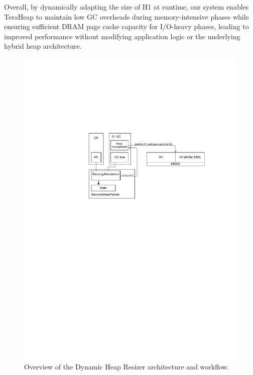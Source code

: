 Overall, by dynamically adapting the size of H1 at runtime, our system enables TeraHeap to maintain low GC overheads during memory-intensive phases while ensuring sufficient DRAM page cache capacity for I/O-heavy phases, leading to improved performance without modifying application logic or the underlying hybrid heap architecture.

\begin{figure}[htbp]
  \centering
\includegraphics[width=1.1\columnwidth]{fig/HeapResizer.pdf}
  \caption{Overview of the Dynamic Heap Resizer architecture and workflow.}
  \label{fig:dynamic_heap_resizer}
\end{figure}

